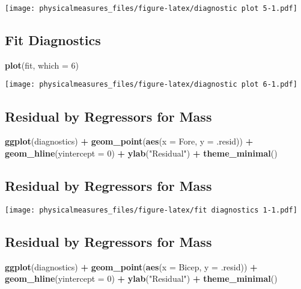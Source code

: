 \documentclass[]{article}
\newenvironment{Shaded}{\begin{snugshade}}{\end{snugshade}}
\newcommand{\KeywordTok}[1]{\textcolor[rgb]{0.13,0.29,0.53}{\textbf{#1}}}
\newcommand{\DataTypeTok}[1]{\textcolor[rgb]{0.13,0.29,0.53}{#1}}
\newcommand{\DecValTok}[1]{\textcolor[rgb]{0.00,0.00,0.81}{#1}}
\newcommand{\StringTok}[1]{\textcolor[rgb]{0.31,0.60,0.02}{#1}}
\newcommand{\OperatorTok}[1]{\textcolor[rgb]{0.81,0.36,0.00}{\textbf{#1}}}
\newcommand{\NormalTok}[1]{#1}
\begin{document}
\texttt{[image: physicalmeasures\_files/figure-latex/diagnostic plot 5-1.pdf]}

\subsection{Fit Diagnostics}\label{fit-diagnostics-9}

\begin{Shaded}
\begin{Highlighting}[]
\KeywordTok{plot}\NormalTok{(fit, }\DataTypeTok{which =} \DecValTok{6}\NormalTok{)}
\end{Highlighting}
\end{Shaded}

\texttt{[image: physicalmeasures\_files/figure-latex/diagnostic plot 6-1.pdf]}

\subsection{Residual by Regressors for
Mass}\label{residual-by-regressors-for-mass}

\begin{Shaded}
\begin{Highlighting}[]
\KeywordTok{ggplot}\NormalTok{(diagnostics) }\OperatorTok{+}
\StringTok{  }\KeywordTok{geom_point}\NormalTok{(}\KeywordTok{aes}\NormalTok{(}\DataTypeTok{x =}\NormalTok{ Fore, }\DataTypeTok{y =}\NormalTok{ .resid)) }\OperatorTok{+}
\StringTok{  }\KeywordTok{geom_hline}\NormalTok{(}\DataTypeTok{yintercept =} \DecValTok{0}\NormalTok{) }\OperatorTok{+}
\StringTok{  }\KeywordTok{ylab}\NormalTok{(}\StringTok{"Residual"}\NormalTok{) }\OperatorTok{+}
\StringTok{  }\KeywordTok{theme_minimal}\NormalTok{()}
\end{Highlighting}
\end{Shaded}

\subsection{Residual by Regressors for
Mass}\label{residual-by-regressors-for-mass-1}

\texttt{[image: physicalmeasures\_files/figure-latex/fit diagnostics 1-1.pdf]}

\subsection{Residual by Regressors for
Mass}\label{residual-by-regressors-for-mass-2}

\begin{Shaded}
\begin{Highlighting}[]
\KeywordTok{ggplot}\NormalTok{(diagnostics) }\OperatorTok{+}
\StringTok{  }\KeywordTok{geom_point}\NormalTok{(}\KeywordTok{aes}\NormalTok{(}\DataTypeTok{x =}\NormalTok{ Bicep, }\DataTypeTok{y =}\NormalTok{ .resid)) }\OperatorTok{+}
\StringTok{  }\KeywordTok{geom_hline}\NormalTok{(}\DataTypeTok{yintercept =} \DecValTok{0}\NormalTok{) }\OperatorTok{+}
\StringTok{  }\KeywordTok{ylab}\NormalTok{(}\StringTok{"Residual"}\NormalTok{) }\OperatorTok{+}
\StringTok{  }\KeywordTok{theme_minimal}\NormalTok{()}
\end{Highlighting}
\end{Shaded}
\end{document}
